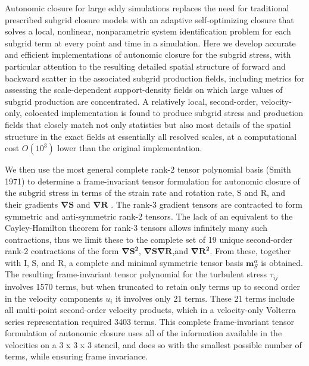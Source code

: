 Autonomic closure for large eddy simulations replaces the need for traditional prescribed subgrid closure models with an adaptive self-optimizing closure that solves a local, nonlinear, nonparametric system identification problem for each subgrid term at every point and time in a simulation. Here we develop accurate and efficient implementations of autonomic closure for the subgrid stress, with particular attention to the resulting detailed spatial structure of forward and backward scatter in the associated subgrid production fields, including metrics for assessing the scale-dependent support-density fields on which large values of subgrid production are concentrated. A relatively local, second-order, velocity-only, colocated implementation is found to produce subgrid stress and production fields that closely match not only statistics but also most details of the spatial structure in the exact fields at essentially all resolved scales, at a computational cost $O(10^3)$ lower than the original implementation. 

We then use the most general complete rank-2 tensor polynomial basis (Smith 1971) to determine a frame-invariant tensor formulation for autonomic closure of the subgrid stress in terms of the strain rate and rotation rate, S and R, and their gradients   $\mathbf{\nabla S}$  and   $\mathbf{\nabla R}$ . The rank-3 gradient tensors are contracted to form symmetric and anti-symmetric rank-2 tensors. The lack of an equivalent to the Cayley-Hamilton theorem for rank-3 tensors allows infinitely many such contractions, thus we limit these to the complete set of 19 unique second-order rank-2 contractions of the form   $\mathbf{\nabla S^2}$,   $\mathbf{\nabla S}$$\mathbf{\nabla R}$,and   $\mathbf{\nabla R^2}$. From these, together with I, S, and R, a complete and minimal symmetric tensor basis   $\mathbf{m}_{S}^{\alpha}$   is obtained. The resulting frame-invariant tensor polynomial for the turbulent stress   $\tau_{ij}$   involves 1570 terms, but when truncated to retain only terms up to second order in the velocity components  $u_i$  it involves only 21 terms. These 21 terms include all multi-point second-order velocity products, which in a velocity-only Volterra series representation required 3403 terms. This complete frame-invariant tensor formulation of autonomic closure uses all of the information available in the velocities on a  3 x 3 x 3 stencil, and does so with the smallest possible number of terms, while ensuring frame invariance.

